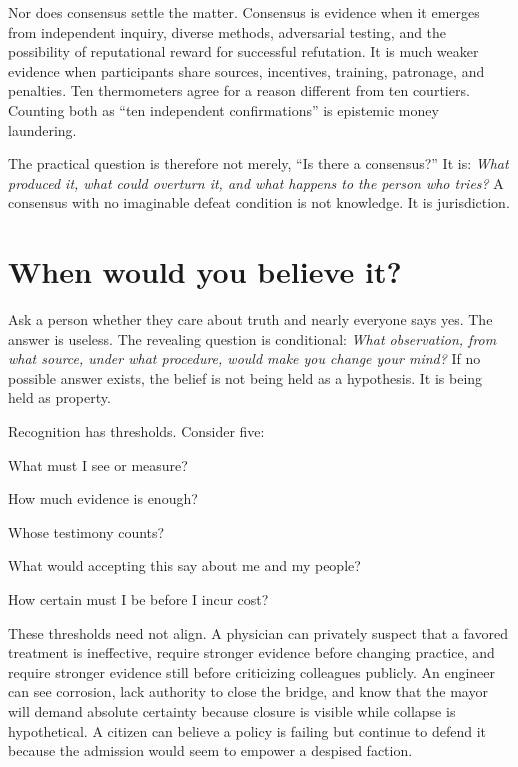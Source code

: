 ﻿\documentclass[12pt,a4paper]{book}
\begin{document}
Nor does consensus settle the matter. Consensus is evidence when it emerges from independent inquiry, diverse methods, adversarial testing, and the possibility of reputational reward for successful refutation. It is much weaker evidence when participants share sources, incentives, training, patronage, and penalties. Ten thermometers agree for a reason different from ten courtiers. Counting both as “ten independent confirmations” is epistemic money laundering.

The practical question is therefore not merely, “Is there a consensus?” It is: \emph{What produced it, what could overturn it, and what happens to the person who tries?} A consensus with no imaginable defeat condition is not knowledge. It is jurisdiction.

\section{When would you believe it?}

Ask a person whether they care about truth and nearly everyone says yes. The answer is useless. The revealing question is conditional: \emph{What observation, from what source, under what procedure, would make you change your mind?} If no possible answer exists, the belief is not being held as a hypothesis. It is being held as property.

Recognition has thresholds. Consider five:

\begin{description}[leftmargin=2.4em,style=nextline]
  \item[Perceptual threshold.] What must I see or measure?
  \item[Probative threshold.] How much evidence is enough?
  \item[Source threshold.] Whose testimony counts?
  \item[Identity threshold.] What would accepting this say about me and my people?
  \item[Action threshold.] How certain must I be before I incur cost?
\end{description}

These thresholds need not align. A physician can privately suspect that a favored treatment is ineffective, require stronger evidence before changing practice, and require stronger evidence still before criticizing colleagues publicly. An engineer can see corrosion, lack authority to close the bridge, and know that the mayor will demand absolute certainty because closure is visible while collapse is hypothetical. A citizen can believe a policy is failing but continue to defend it because the admission would seem to empower a despised faction.
\end{document}
